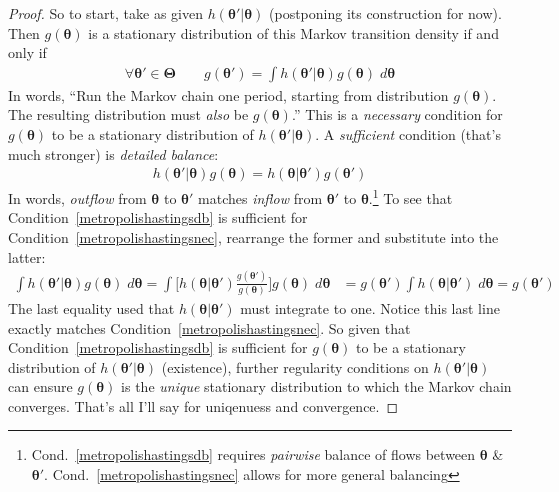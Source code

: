 \documentclass[12pt]{article}
\theoremstyle{plain}
\theoremstyle{definition}
\theoremstyle{remark}
\newcommand{\bstheta}{\boldsymbol{\theta}}
\newcommand{\bsTheta}{\boldsymbol{\Theta}}
\begin{document}
\begin{proof}
So to start, take as given $h(\bstheta'|\bstheta)$ (postponing its
construction for now).
Then $g(\bstheta)$ is a stationary distribution of this Markov
transition density if and only if
\begin{align}
  \forall \bstheta'\in\bsTheta
  \qquad
  g(\bstheta')
  = \int h(\bstheta'|\bstheta) g(\bstheta) \; d\bstheta
  \label{metropolishastingsnec}
\end{align}
In words, ``Run the Markov chain one period, starting from distribution
$g(\bstheta)$.  The resulting distribution must \emph{also} be
$g(\bstheta)$.''
This is a \emph{necessary} condition for $g(\bstheta)$ to be a
stationary distribution of $h(\bstheta'|\bstheta)$. A \emph{sufficient}
condition (that's much stronger) is \emph{detailed balance}:
\begin{align}
  h(\bstheta'|\bstheta)g(\bstheta)
  =
  h(\bstheta|\bstheta')g(\bstheta')
  \label{metropolishastingsdb}
\end{align}
In words, \emph{outflow} from $\bstheta$ to $\bstheta'$
matches \emph{inflow} from $\bstheta'$ to $\bstheta$.\footnote{%
  Cond.~\ref{metropolishastingsdb} requires \emph{pairwise} balance of
  flows between $\bstheta$ \& $\bstheta'$.
  Cond.~\ref{metropolishastingsnec} allows for more general balancing
}
To see that Condition~\ref{metropolishastingsdb} is sufficient for
Condition~\ref{metropolishastingsnec}, rearrange the former and
substitute into the latter:
\begin{align*}
  \int
  h(\bstheta'|\bstheta) g(\bstheta) \; d\bstheta
  = \int
  \bigg[
  h(\bstheta|\bstheta')\frac{g(\bstheta')}{g(\bstheta)}
  \bigg]
  g(\bstheta)
  \; d\bstheta
  &= g(\bstheta')
  \int
  h(\bstheta|\bstheta')
  \; d\bstheta
  = g(\bstheta')
\end{align*}
The last equality used that $h(\bstheta|\bstheta')$ must integrate to
one. Notice this last line exactly matches
Condition~\ref{metropolishastingsnec}.
So given that Condition~\ref{metropolishastingsdb} is sufficient for
$g(\bstheta)$ to be a stationary distribution of $h(\bstheta'|\bstheta)$
(existence), further regularity conditions on $h(\bstheta'|\bstheta)$
can ensure $g(\bstheta)$ is the \emph{unique} stationary distribution to
which the Markov chain converges.
That's all I'll say for uniqenuess and convergence.


\end{proof}
\end{document}
